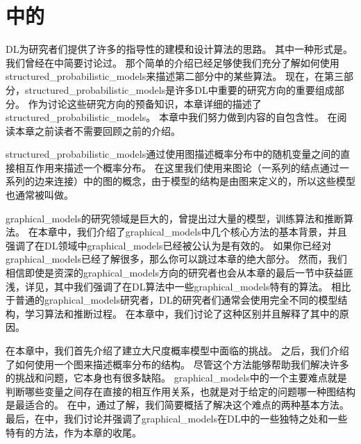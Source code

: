 \chapter{中的}
\label{chap:structured_probabilistic_models_for_deep_learning}


\gls{DL}为研究者们提供了许多的指导性的建模和设计算法的思路。
其中一种形式是。
我们曾经在中简要讨论过。
那个简单的介绍已经足够使我们充分了解如何使用\gls{structured_probabilistic_models}来描述第二部分中的某些算法。
现在，在第三部分，\gls{structured_probabilistic_models}是许多\gls{DL}中重要的研究方向的重要组成部分。
作为讨论这些研究方向的预备知识，本章详细的描述了\gls{structured_probabilistic_models}。
本章中我们努力做到内容的自包含性。
在阅读本章之前读者不需要回顾之前的介绍。


\gls{structured_probabilistic_models}通过使用图描述概率分布中的随机变量之间的直接相互作用来描述一个概率分布。
在这里我们使用来图论（一系列的结点通过一系列的边来连接）中的图的概念，由于模型的结构是由图来定义的，所以这些模型也通常被叫做。


\gls{graphical_models}的研究领域是巨大的，曾提出过大量的模型，训练算法和推断算法。
在本章中，我们介绍了\gls{graphical_models}中几个核心方法的基本背景，并且强调了在\gls{DL}领域中\gls{graphical_models}已经被公认为是有效的。
如果你已经对\gls{graphical_models}已经了解很多，那么你可以跳过本章的绝大部分。
然而，我们相信即使是资深的\gls{graphical_models}方向的研究者也会从本章的最后一节中获益匪浅，详见，其中我们强调了在\gls{DL}算法中一些\gls{graphical_models}特有的算法。
相比于普通的\gls{graphical_models}研究者，\gls{DL}的研究者们通常会使用完全不同的模型结构，学习算法和推断过程。
在本章中，我们讨论了这种区别并且解释了其中的原因。


在本章中，我们首先介绍了建立大尺度概率模型中面临的挑战。
之后，我们介绍了如何使用一个图来描述概率分布的结构。
尽管这个方法能够帮助我们解决许多的挑战和问题，它本身也有很多缺陷。
\gls{graphical_models}中的一个主要难点就是判断哪些变量之间存在直接的相互作用关系，也就是对于给定的问题哪一种图结构是最适合的。
在中，通过了解，我们简要概括了解决这个难点的两种基本方法。
最后，在中，我们讨论并强调了\gls{graphical_models}在\gls{DL}中的一些独特之处和一些特有的方法，作为本章的收尾。



